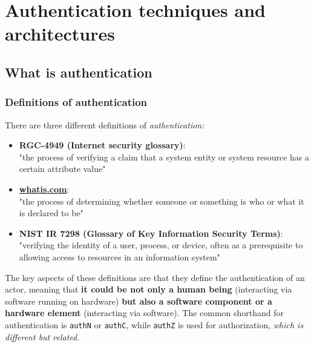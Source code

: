 \chapter{Authentication techniques and architectures}

\section{What is authentication}


\subsection*{Definitions of authentication}
There are three different definitions of \emph{authentication:}
\begin{itemize}
  \item \textbf{RGC-4949 (Internet security glossary)}:\\
        "the process of verifying a claim that a system entity or system
        resource has a certain attribute value"
  \item \textbf{\url{whatis.com}}:\\
        "the process of determining whether someone or something is
        who or what it is declared to be"
  \item \textbf{NIST IR 7298 (Glossary of Key Information Security Terms)}:\\
        "verifying the identity of a user, process, or device, often as a
        prerequisite to allowing access to resources in an information
        system"
\end{itemize}
The key aspects of these definitions  are that they define the authentication of an actor, meaning that \textbf{it could be not only a human being} (interacting via software running on hardware) \textbf{but also a software component or a hardware element} (interacting via software). The common shorthand for authentication is \texttt{authN} or \texttt{authC}, while \texttt{authZ} is used for authorization, \textit{which is different but related}.


